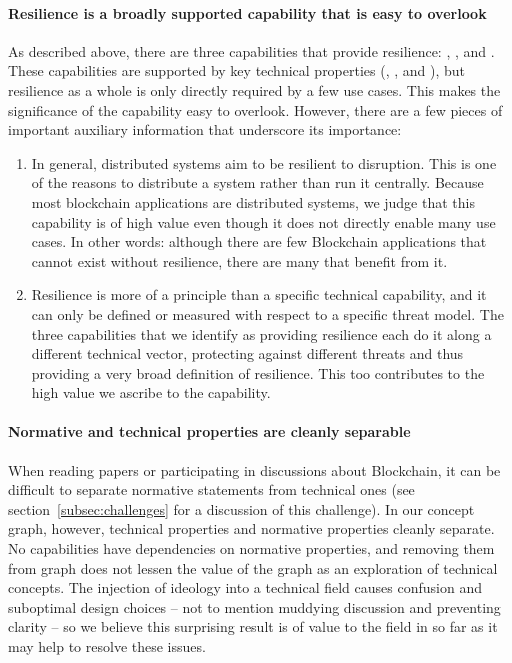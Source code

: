 {\paragraph{Resilience is a broadly supported capability that is easy to overlook}
As described above, there are three capabilities that provide resilience: , , and . These capabilities are supported by key technical properties (, , and ), but resilience as a whole is only directly required by a few use cases. This makes the significance of the capability easy to overlook. However, there are a few pieces of important auxiliary information that underscore its importance:

\begin{enumerate}
	\item In general, distributed systems aim to be resilient to disruption. This is one of the reasons to distribute a system rather than run it centrally. Because most blockchain applications are distributed systems, we judge that this capability is of high value even though it does not directly enable many use cases. In other words: although there are few Blockchain applications that cannot exist without resilience, there are many that benefit from it.
	\item Resilience is more of a principle than a specific technical capability, and it can only be defined or measured with respect to a specific threat model. The three capabilities that we identify as providing resilience each do it along a different technical vector, protecting against different threats and thus providing a very broad definition of resilience. This too contributes to the high value we ascribe to the capability.
\end{enumerate}

\paragraph{Normative and technical properties are cleanly separable}
When reading papers or participating in discussions about Blockchain, it can be difficult to separate normative statements from technical ones (see section~\ref{subsec:challenges} for a discussion of this challenge). In our concept graph, however, technical properties and normative properties cleanly separate. No capabilities have dependencies on normative properties, and removing them from graph does not lessen the value of the graph as an exploration of technical concepts. The injection of ideology into a technical field causes confusion and suboptimal design choices -- not to mention muddying discussion and preventing clarity -- so we believe this surprising result is of value to the field in so far as it may help to resolve these issues.

}
